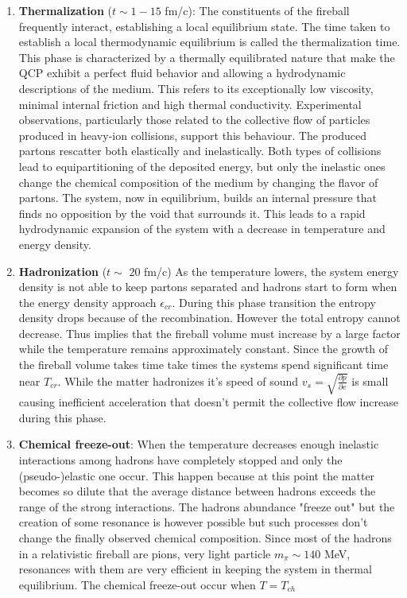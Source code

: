 \documentclass[12pt,a4paper]{book}
\begin{document}
\begin{enumerate}
		\item  \textbf{Thermalization} ($t \sim 1 - 15$ fm/c): The constituents of the fireball frequently interact, establishing a local equilibrium state. The time taken to establish a local thermodynamic equilibrium is called the thermalization time. This phase is characterized by a thermally equilibrated nature that make the QCP exhibit a perfect fluid behavior and allowing a hydrodynamic descriptions of the medium.  This refers to its exceptionally low viscosity, minimal internal friction and high thermal conductivity. Experimental observations, particularly those related to the collective flow of particles produced in heavy-ion collisions, support this behaviour. The produced partons rescatter both elastically and inelastically. Both types of collisions lead to equipartitioning of the deposited energy, but only the inelastic ones change the chemical composition of the medium by changing the flavor of partons. The system, now in equilibrium, builds an internal pressure that finds no opposition by the void that surrounds it. This leads to a rapid hydrodynamic expansion of the system  with a decrease in temperature and energy density. 
		
		\item \textbf{Hadronization} ($t \sim$ 20 fm/c) As the temperature lowers, the system energy density is not able to keep partons separated and hadrons start to form when the energy density approach $\epsilon_{cr}$. During this phase transition the entropy density drops because of the recombination. However the total entropy cannot decrease. Thus implies that the fireball volume must increase by a large factor while the temperature remains approximately constant. Since the growth of the fireball volume takes time take times the systems spend significant time near $T_{cr}$. While the matter hadronizes it's speed of sound $v_s=\sqrt{\frac{\partial p}{\partial e}}$ is small causing inefficient acceleration that doesn't permit the collective flow increase during this phase.
		
		\item \textbf{Chemical freeze-out}: When the temperature decreases enough inelastic interactions among hadrons have completely stopped and only the (pseudo-)elastic one occur. This happen because at this point the matter becomes so dilute that the average distance between hadrons exceeds the range of the strong interactions. The hadrons abundance "freeze out" but the creation of some resonance is however possible but such processes don’t change the finally observed chemical composition. Since most of the	hadrons in a relativistic fireball are pions, very light particle $m_\pi \sim 140$ MeV, resonances with them are very efficient in keeping the system in thermal equilibrium. The chemical freeze-out occur when $T= T_{ch}$
		

\end{enumerate}
\end{document}
